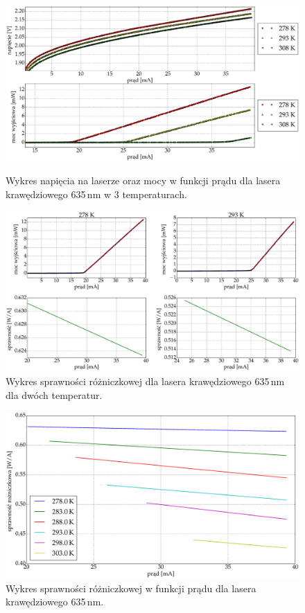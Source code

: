 \begin{figure}
\center
  \includegraphics[scale=0.30]{plot635/plot_voltage_power.eps}
  \label{fig:plot_voltage_power}
  \caption{Wykres napięcia na laserze oraz mocy w funkcji prądu dla lasera krawędziowego 635\,nm w 3 temperaturach.}
\end{figure}
\begin{figure}
\center
  \includegraphics[scale=0.30]{plot635/plot_eff_via_current4.eps}
  \caption{Wykres sprawności różniczkowej dla lasera krawędziowego 635\,nm dla dwóch temperatur.}
  \label{fig:plot_eff_via_current4}
\end{figure}
\begin{figure}
\center
  \includegraphics[scale=0.25]{plot635/plot_eff_via_current_all.eps}
  \caption{Wykres sprawności różniczkowej w funkcji prądu dla lasera krawędziowego 635\,nm.}
  \label{fig:plot_eff_via_current_all}
\end{figure}
\newpage

